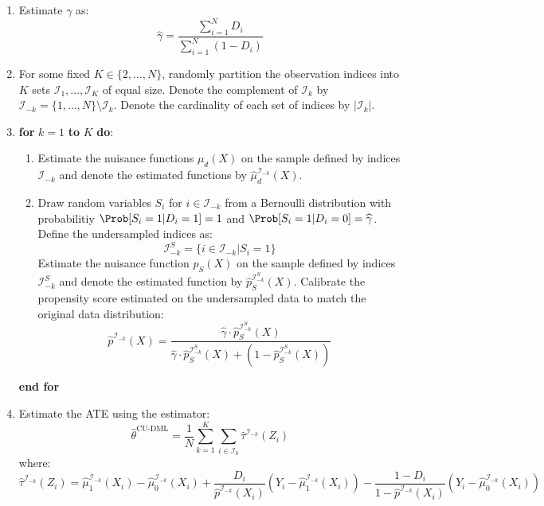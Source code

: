 \begin{enumerate}[label*=\textsc{Step} \arabic*]
    \item Estimate $\gamma$ as:
    \begin{equation}\label{eq:odd_estimator}
        \widehat{\gamma} = \frac{\sum_{i=1}^{N} D_i}{\sum_{i=1}^{N} (1-D_i)}
    \end{equation}
    \item For some fixed $K \in \{2, \dots, N\}$, randomly partition the observation indices into $K$ sets $\mathcal{I}_1, \dots, \mathcal{I}_K$ of equal size. Denote the complement of $\mathcal{I}_k$ by $\mathcal{I}_{-k} = \{1, \dots, N\}\setminus\mathcal{I}_k$. Denote the cardinality of each set of indices by $\vert \mathcal{I}_k \vert$.
    \item \textbf{for} $k=1$ \textbf{to} $K$ \textbf{do}:\\[0.2cm]
    \begin{enumerate}[label*=.\arabic*]
        \item Estimate the nuisance functions $\mu_d(X)$ on the sample defined by indices $\mathcal{I}_{-k}$ and denote the estimated functions by $\widehat{\mu}_d^{\mathcal{I}_{-k}}(X)$.
        \item Draw random variables $S_i$ for $i \in \mathcal{I}_{-k}$ from a Bernoulli distribution with probabilitiy $\Prob[S_i=1|D_i=1] = 1$ and $\Prob[S_i=1|D_i=0] = \widehat\gamma$. Define the undersampled indices as:
        \begin{equation*}
            \mathcal{I}_{-k}^S = \{ i \in \mathcal{I}_{-k} \vert S_i=1 \}
        \end{equation*}
        Estimate the nuisance function $p_S(X)$ on the sample defined by indices $\mathcal{I}^S_{-k}$ and denote the estimated function by $\widehat{p}_S^{\mathcal{I}^S_{-k}}(X)$.
        Calibrate the propensity score estimated on the undersampled data to match the original data distribution:
        \begin{equation}\label{eq:propensity_estimator}
            \widehat{p}^{\mathcal{I}_{-k}}(X) = \frac{\widehat{\gamma}\cdot \widehat{p}_S^{\mathcal{I}^S_{-k}}(X)}{\widehat{\gamma} \cdot \widehat{p}_S^{\mathcal{I}^S_{-k}}(X) + \left(1-\widehat{p}_S^{\mathcal{I}^S_{-k}}(X)\right)}
        \end{equation}
    \end{enumerate}
    \textbf{end for}
    \item Estimate the ATE using the estimator:
    \begin{equation}
        \widehat{\theta}^{\text{CU-DML}} = \frac{1}{N}\sum_{k=1}^{K} \sum_{i\in\mathcal{I}_k} \widehat\tau^{\mathcal{I}_{-k}}(Z_i)
    \end{equation}
    where:
    \begin{equation*}
        \widehat\tau^{\mathcal{I}_{-k}}(Z_i) = \widehat\mu^{\mathcal{I}_{-k}}_1(X_i) - \widehat\mu^{\mathcal{I}_{-k}}_0(X_i) + \frac{D_i}{\widehat{p}^{\mathcal{I}_{-k}}(X_i)}(Y_i-\widehat\mu^{\mathcal{I}_{-k}}_1(X_i)) - \frac{1-D_i}{1-\widehat{p}^{\mathcal{I}_{-k}}(X_i)}(Y_i-\widehat\mu^{\mathcal{I}_{-k}}_0(X_i))
    \end{equation*}
\end{enumerate}

